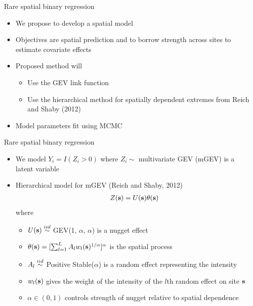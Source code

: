 \documentclass{beamer}
\begin{document}
\begin{frame}{Rare spatial binary regression}
  \begin{itemize} \setlength{\itemsep}{1em}
    \item We propose to develop a spatial model
    \item Objectives are spatial prediction and to borrow strength across sites to estimate covariate effects
    \item Proposed method will \vspace{0.5em}
    \begin{itemize} \setlength{\itemsep}{0.5em}
      \item Use the GEV link function
      \item Use the hierarchical method for spatially dependent extremes from Reich and Shaby (2012)
    \end{itemize}
    \item Model parameters fit using MCMC
  \end{itemize}
\end{frame}

\begin{frame}{Rare spatial binary regression}
  \begin{itemize} \setlength{\itemsep}{1em}
    \item We model $Y_i = I(Z_i > 0)$ where $Z_i\sim$ multivariate GEV (mGEV)  is a latent variable
    \item Hierarchical model for mGEV (Reich and Shaby, 2012)
    \begin{align*}
      Z(\mbox{\bf s}) = U(\mbox{\bf s}) \theta(\mbox{\bf s})
    \end{align*}
    where
    \begin{itemize} \setlength{\itemsep}{0.25em}
      \item $U(\mbox{\bf s}) \stackrel{iid}{\sim}$ GEV(1, $\alpha$, $\alpha$) is a nugget effect
      \item $\theta(\mbox{\bf s}) = [\sum_{l = 1}^L A_l w_l(\mbox{\bf s})^{1/\alpha}]^\alpha$ is the spatial process
      \item $A_l \stackrel{iid}{\sim}$ Positive Stable($\alpha$) is a random effect representing the intensity
      \item $w_l(\mbox{\bf s})$ gives the weight of the intensity of the $l$th random effect on site $\mbox{\bf s}$
      \item $\alpha \in (0, 1)$ controls strength of nugget relative to spatial dependence
    \end{itemize}
  \end{itemize}
\end{frame}
\end{document}
